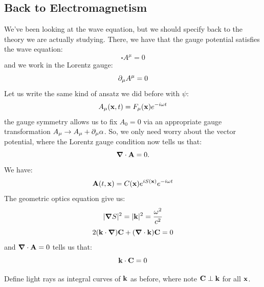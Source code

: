 \subsection{Back to Electromagnetism}
We've been looking at the wave equation, but we should specify back to the theory we are actually studying. There, we have that the gauge potential satisfies the wave equation:
\begin{equation}
    \square A^\mu = 0
\end{equation}
and we work in the Lorentz gauge:
\begin{equation}
    \partial_\mu A^\mu = 0
\end{equation}
Let us write the same kind of ansatz we did before with $\psi$:
\begin{equation}
    A_\mu(\mathbf{x}, t) = F_\mu(\mathbf{x})e^{-i\omega t}
\end{equation}
the gauge symmetry allows us to fix $A_0 = 0$ via an appropriate gauge transformation $A_\mu \to A_\mu + \partial_\mu \alpha$. So, we only need worry about the vector potential, where the Lorentz gauge condition now tells us that:
\begin{equation}
    \nabla \cdot \v{A} = 0.
\end{equation}
We have:
\begin{equation}
    \mathbf{A}(t, \mathbf{x}) = C(\mathbf{x})e^{iS(\mathbf{x})}e^{-i\omega t}
\end{equation}
The geometric optics equation give us:
\begin{equation}
    \abs{\nabla S}^2 = \abs{\v{k}}^2 = \frac{\omega^2}{c^2}
\end{equation}
\begin{equation}\label{eq:geomopticsEM}
    2(\v{k} \cdot \nabla)\v{C} + (\nabla \cdot \v{k})\v{C} = 0
\end{equation}
and $\nabla \cdot \v{A} = 0$ tells us that:
\begin{equation}
    \mathbf{k} \cdot \mathbf{C} = 0
\end{equation}

Define light rays as integral curves of $\mathbf{k}$ as before, where note $\mathbf{C} \perp \mathbf{k}$ for all $\mathbf{x}$.

